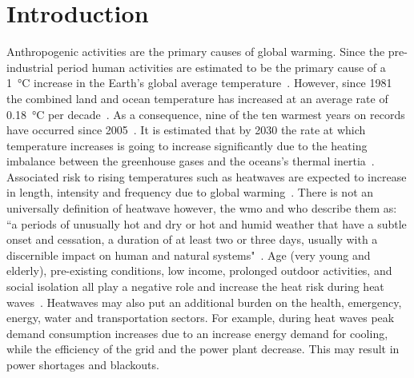 

%

\section{Introduction}\label{sec:introduction}

Anthropogenic activities are the primary causes of global warming.
Since the pre-industrial period human activities are estimated to be the primary cause of a 1~°C increase in the Earth's global average temperature~\cite{GlobalWa91:online}.
However, since 1981 the combined land and ocean temperature has increased at an average rate of 0.18~°C per decade~\cite{GlobalCl28:online}.
As a consequence, nine of the ten warmest years on records have occurred since 2005~\cite{ClimateC26:online}.
It is estimated that by 2030 the rate at which temperature increases is going to increase significantly due to the heating imbalance between the greenhouse gases and the oceans's thermal inertia~\cite{ClimateC26:online}.
Associated risk to rising temperatures such as heatwaves are expected to increase in length, intensity and frequency due to global warming~\cite{Whatharm75:online}.
There is not an universally definition of heatwave however, the \ac{wmo} and \ac{who} describe them as: ``a periods of unusually hot and dry or hot and humid weather that have a
subtle onset and cessation, a duration of at least two or three days, usually with a discernible impact on human and natural systems"~\cite{WMO2015}.
Age (very young and elderly), pre-existing conditions, low income, prolonged outdoor activities, and social isolation all play a negative role and increase the heat risk during heat waves~\cite{WMO2015}.
Heatwaves may also put an additional burden on the health, emergency, energy, water and transportation sectors.
For example, during heat waves peak demand consumption increases due to an increase energy demand for cooling, while the efficiency of the grid and the power plant decrease.
This may result in power shortages and blackouts.

